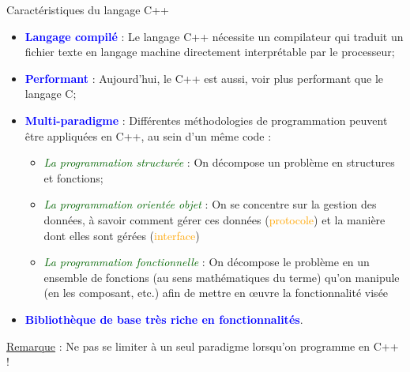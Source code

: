\documentclass[compress,10pt,aspectratio=169]{beamer}
\begin{document}
\begin{frame}{Caractéristiques du langage C++}
    \scriptsize
    \begin{itemize}
        \item \textbf{\textcolor{blue}{Langage compilé}} : Le langage C++ nécessite un compilateur qui traduit un fichier texte en langage machine
                                                     directement interprétable par le processeur;
        \item \textbf{\textcolor{blue}{Performant}} : Aujourd'hui, le C++ est aussi, voir plus performant que le langage C;
        \item \textbf{\textcolor{blue}{Multi-paradigme}} : Différentes méthodologies de programmation peuvent être appliquées en C++,
                                                           au sein d'un même code :
            \begin{itemize}
                \scriptsize
                \item \textsl{\textcolor{DarkGreen}{La programmation structurée}} : On décompose un problème en structures et fonctions;
                \item \textsl{\textcolor{DarkGreen}{La programmation orientée objet}} : On se concentre sur la gestion des données, à
                               savoir comment gérer ces données (\textcolor{orange}{protocole}) et la manière dont elles sont gérées (\textcolor{orange}{interface})
                \item \textsl{\textcolor{DarkGreen}{La programmation fonctionnelle}} : On décompose le problème en un ensemble de fonctions (au sens mathématiques du terme) qu'on manipule (en les composant, etc.) afin de mettre en {\oe}uvre la fonctionnalité visée
            \end{itemize}
        \item \textbf{\textcolor{blue}{Bibliothèque de base très riche en fonctionnalités}}.
    \end{itemize}

    \underline{Remarque} : Ne pas se limiter à un seul paradigme lorsqu'on programme en C++ !
\end{frame}
\end{document}
